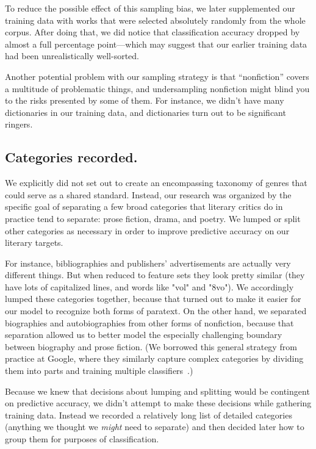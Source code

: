 \documentclass[paper=a4, fontsize=12pt]{scrartcl}
\numberwithin{equation}{section}		%
\numberwithin{figure}{section}			%
\numberwithin{table}{section}				%
\begin{document}
To reduce the possible effect of this sampling bias, we later supplemented our training data with works that were selected absolutely randomly from the whole corpus. After doing that, we did notice that classification accuracy dropped by almost a full percentage point---which may suggest that our earlier training data had been unrealistically well-sorted.

Another potential problem with our sampling strategy is that ``nonfiction'' covers a multitude of problematic things, and undersampling nonfiction might blind you to the risks presented by some of them. For instance, we didn't have many dictionaries in our training data, and dictionaries turn out to be significant ringers.

\subsection{Categories recorded.}

We explicitly did not set out to create an encompassing taxonomy of genres that could serve as a shared standard. Instead, our research was organized by the specific goal of separating a few broad categories that literary critics do in practice tend to separate: prose fiction, drama, and poetry. We lumped or split other categories as necessary in order to improve predictive accuracy on our literary targets. 

For instance, bibliographies and publishers' advertisements are actually very different things. But when reduced to feature sets they look pretty similar (they have lots of capitalized lines, and words like "vol" and "8vo"). We accordingly lumped these categories together, because that turned out to make it easier for our model to recognize both forms of paratext. On the other hand, we separated biographies and autobiographies from other forms of nonfiction, because that separation allowed us to better model the especially challenging boundary between biography and prose fiction. (We borrowed this general strategy from practice at Google, where they similarly capture complex categories by dividing them into parts and training multiple classifiers~\cite{sculley:adversarial}.) 

Because we knew that decisions about lumping and splitting would be contingent on predictive accuracy, we didn't attempt to make these decisions while gathering training data. Instead we recorded a relatively long list of detailed categories (anything we thought we \textit{might} need to separate) and then decided later how to group them for purposes of classification.
\end{document}
